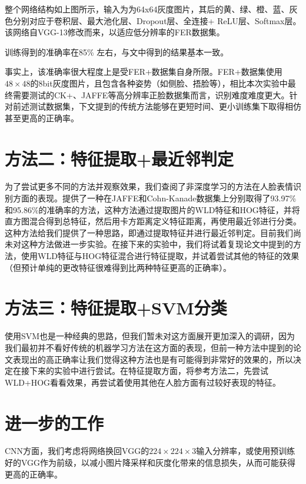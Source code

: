 \documentclass[UTF8]{ctexart}
\begin{document}
整个网络结构如上图所示，输入为为64x64灰度图片，其后的黄、绿、橙、蓝、灰色分别对应于卷积层、最大池化层、Dropout层、全连接+ ReLU层、Softmax层。该网络自VGG-13修改而来，以适应低分辨率的FER数据集。

训练得到的准确率在85\% 左右，与文中得到的结果基本一致。

事实上，该准确率很大程度上是受FER+数据集自身所限。FER+数据集使用$48\times48$的8bit灰度图片，且包含各种姿势（如侧脸、捂脸等），相比本次实验中最终需要测试的CK+、JAFFE等高分辨率正脸数据集而言，识别难度难度更大。针对前述测试数据集，下文提到的传统方法能够在更短时间、更小训练集下取得相仿甚至更高的正确率。

\section{方法二：特征提取+最近邻判定}

为了尝试更多不同的方法并观察效果，我们查阅了非深度学习的方法在人脸表情识别方面的表现。\cite{wang2013feature}提供了一种在JAFFE和Cohn-Kanade数据集上分别取得了93.97\%和95.86\%的准确率的方法，这种方法通过提取图片的WLD特征和HOG特征，并将直方图混合得到总特征，然后用卡方距离定义特征距离，再使用最近邻进行分类。这种方法给我们提供了一种思路，即通过提取特征并进行最近邻判定。目前我们尚未对这种方法做进一步实验。在接下来的实验中，我们将试着复现论文中提到的方法，使用WLD特征与HOG特征混合进行特征提取，并试着尝试其他的特征的效果（但预计单纯的更改特征很难得到比两种特征更高的正确率）。

\section{方法三：特征提取+SVM分类}

使用SVM也是一种经典的思路，但我们暂未对这方面展开更加深入的调研，因为我们最初并不看好传统的机器学习方法在这方面的表现，但前一种方法中提到的论文表现出的高正确率让我们觉得这种方法也是有可能得到非常好的效果的，所以决定在接下来的实验中进行尝试。在特征提取方面，将参考方法二，先尝试WLD+HOG看看效果，再尝试着使用其他在人脸方面有过较好表现的特征。

\section{进一步的工作}

CNN方面，我们考虑将网络换回VGG的$224\times224\times3$输入分辨率，或使用预训练好的VGG作为前级，以减小图片降采样和灰度化带来的信息损失，从而可能获得更高的正确率。
\end{document}
